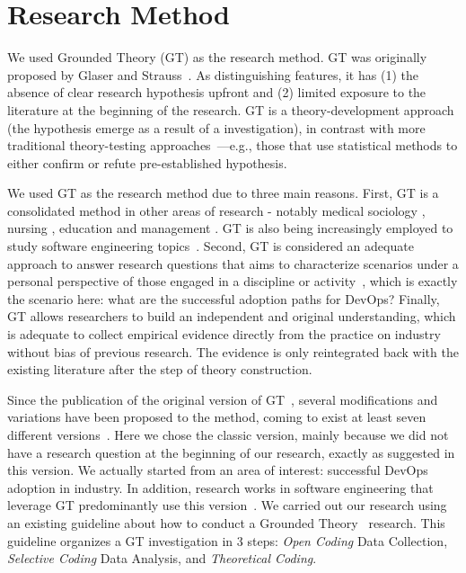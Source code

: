 \section{Research Method} \label{sec:research_method}

We used Grounded Theory (GT) as the research method. GT was
originally proposed by Glaser and Strauss~\cite{glase1967discovery}.
As distinguishing features, it has (1) the absence of clear research hypothesis upfront
and (2) limited exposure to the literature at the beginning of the research. GT
is a theory-development approach (the hypothesis emerge as a result of
a investigation), in contrast with more traditional
theory-testing approaches~\cite{coleman2007using}---e.g., those that
use statistical methods to either confirm or refute pre-established hypothesis.

We used GT as the research method due to three main reasons. First, GT is a consolidated
method in other areas of research - notably medical
sociology \cite{gt_medical_sociology}, nursing \cite{barnsteiner2002using}, education
\cite{gt_education} and management \cite{gt_management}. GT is also being increasingly employed
to study software engineering topics~\cite{hoda2017becoming,stol2016grounded,adolph2011using}. Second,
GT is considered an adequate approach to answer research questions that aims to
characterize scenarios under a personal perspective of those
engaged in a discipline or activity~\cite{barnsteiner2002using},
which is exactly the scenario here: what are the successful adoption paths for DevOps? Finally,
GT allows researchers to build an independent and original understanding,
which is adequate to collect empirical evidence directly from the
practice on industry without bias of previous research. The evidence
is only reintegrated back with the existing literature after the step of
theory construction.

Since the publication of the original version of GT~\cite{glase1967discovery},
several modifications and variations have been proposed to the method, coming to
exist at least seven different versions~\cite{denzin2007grounded}.
Here we chose the classic version, mainly because we did not have a research
question at the beginning of our research, exactly as suggested in this
version. We actually started from an area of interest: successful DevOps adoption
in industry. In addition, research works in software engineering that leverage GT
predominantly use this version~\cite{stol2016grounded}.
We carried out our research using an existing
guideline about how to conduct a
Grounded Theory~\cite{adolph2011using} research. This guideline organizes
a GT investigation in 3 steps: \emph{Open Coding} Data Collection,
\emph{Selective Coding} Data Analysis, and \emph{Theoretical Coding}.

